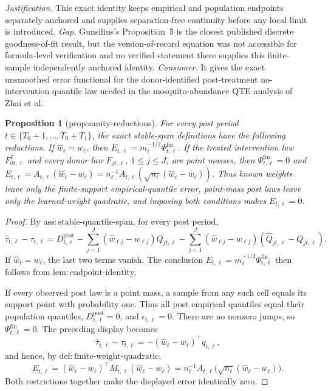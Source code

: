 \documentclass{article}
\newtheorem{proposition}{Proposition}
\begin{document}
\par\smallskip\noindent \textit{Justification.} This exact identity keeps empirical and population endpoints separately anchored and supplies separation-free continuity before any local limit is introduced. \textit{Gap.} Gunsilius's Proposition~5 is the closest published discrete goodness-of-fit result, but the version-of-record equation was not accessible for formula-level verification and no verified statement there supplies this finite-sample independently anchored identity. \textit{Consumer.} It gives the exact unsmoothed error functional for the donor-identified post-treatment no-intervention quantile law needed in the mosquito-abundance QTE analysis of Zhai et al.

\begin{proposition}[prop:sanity-reductions]\label{prop:sanity-reductions}
For every post period \(t\in\{T_0+1,\ldots,T_0+T_1\}\), the exact stable-span definitions have the following reductions. If \(\widehat w_\ell=w_\ell\), then \(E_{t,\ell}=m_\ell^{-1/2}\Psi^{\mathrm{fin}}_{t,\ell}\). If the treated intervention law \(F^I_{0t,\ell}\) and every donor law \(F_{jt,\ell}\), \(1\leq j\leq J\), are point masses, then \(\Psi^{\mathrm{fin}}_{t,\ell}=0\) and \(E_{t,\ell}=A_{t,\ell}(\widehat w_\ell-w_\ell)=n_\ell^{-1}A_{t,\ell}(\sqrt{n_\ell}(\widehat w_\ell-w_\ell))\). Thus known weights leave only the finite-support empirical-quantile error, point-mass post laws leave only the learned-weight quadratic, and imposing both conditions makes \(E_{t,\ell}=0\).
\end{proposition}
\begin{proof}
By \(\mathrm{ass:stable\mbox{-}quantile\mbox{-}span}\), for every post period,
\[
 \widehat\tau_{t,\ell}-\tau_{t,\ell}
 =D^{\mathrm{post}}_{t,\ell}
 -\sum_{j=1}^J(\widehat w_{\ell j}-w_{\ell j})Q_{jt,\ell}
 -\sum_{j=1}^J(\widehat w_{\ell j}-w_{\ell j})
   (\widehat Q_{jt,\ell}-Q_{jt,\ell}).
\]
If \(\widehat w_\ell=w_\ell\), the last two terms vanish.  The conclusion
\(E_{t,\ell}=m_\ell^{-1/2}\Psi^{\mathrm{fin}}_{t,\ell}\) then follows from \(\mathrm{lem:endpoint\mbox{-}identity}\).

If every observed post law is a point mass, a sample from any such cell equals its support point with probability one.  Thus all post empirical quantiles equal their population quantiles, \(D^{\mathrm{post}}_{t,\ell}=0\), and \(\epsilon_{t,\ell}=0\).  There are no nonzero jumps, so \(\Psi^{\mathrm{fin}}_{t,\ell}=0\).  The preceding display becomes
\[
 \widehat\tau_{t,\ell}-\tau_{t,\ell}
 =-(\widehat w_\ell-w_\ell)^\top q_{t,\ell},
\]
and hence, by \(\mathrm{def:finite\mbox{-}weight\mbox{-}quadratic}\),
\[
 E_{t,\ell}=(\widehat w_\ell-w_\ell)^\top M_{t,\ell}
 (\widehat w_\ell-w_\ell)
 =n_\ell^{-1}A_{t,\ell}\bigl(\sqrt{n_\ell}
 (\widehat w_\ell-w_\ell)\bigr).
\]
Both restrictions together make the displayed error identically zero.
\end{proof}
\end{document}
